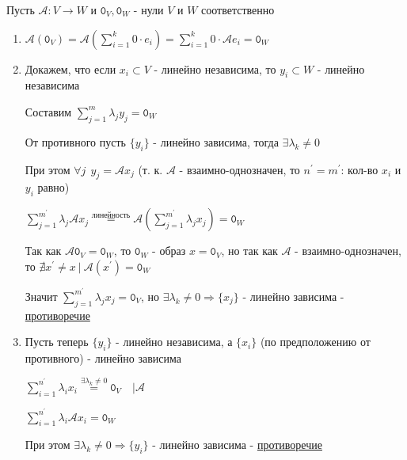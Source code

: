 \documentclass[12pt]{article}
\begin{document}
    \begin{MyProof}
        Пусть $\mathcal{A} : V \rightarrow W$ и $\texttt{0}_V, \texttt{0}_W$ - нули $V$ и $W$ соответственно

        \begin{enumerate}
            \item $\mathcal{A}(\texttt{0}_V) = \mathcal{A}\left(\sum^k_{i=1} 0 \cdot e_i\right) = \sum^k_{i=1} 0 \cdot \mathcal{A}e_i = \texttt{0}_W$

            \item Докажем, что если ${x_i} \subset V$ - линейно независима, то ${y_i} \subset W$ - линейно независима

            Составим $\sum^m_{j=1} \lambda_j y_j = \texttt{0}_W$ 
            
            От противного пусть $\{y_i\}$ - линейно зависима, тогда $\exists \lambda_k \neq 0$

            При этом $\forall j \ \ y_j = \mathcal{A}x_j$ (т. к. $\mathcal{A}$ - взаимно-однозначен, 
            то $n^\prime = m^\prime$: кол-во $x_i$ и $y_i$ равно)

            $\sum^{m^\prime}_{j=1} \lambda_j \mathcal{A}x_j \stackrel{\text{линейность}}{=} \mathcal{A} (\sum^{m^\prime}_{j=1} \lambda_j x_j) = \texttt{0}_W$

            Так как $\mathcal{A}\texttt{0}_V = \texttt{0}_W$, то $\texttt{0}_W$ - образ $x = \texttt{0}_V$, 
            но так как $\mathcal{A}$ - взаимно-однозначен, то
            $\nexists x^\prime \neq x \ | \ \mathcal{A}(x^\prime) = \texttt{0}_W$

            Значит $\sum^{m^\prime}_{j=1} \lambda_j x_j = \texttt{0}_V$, но 
            $\exists \lambda_k \neq 0 \Longrightarrow \{x_j\}$ - линейно зависима - \underline{противоречие}

            \item Пусть теперь $\{y_i\}$ - линейно независима, а $\{x_i\}$ (по предположению от противного) - линейно зависима

            $\sum^{n^\prime}_{i = 1} \lambda_i x_i \stackrel{\exists \lambda_k \neq 0}{=} \texttt{0}_V \quad \Big| \mathcal{A}$

            $\sum^{n^\prime}_{i = 1} \lambda_i \mathcal{A}x_i = \texttt{0}_W$

            При этом $\exists \lambda_k \neq 0 \Longrightarrow \{y_i\}$ - линейно зависима - \underline{противоречие}

        \end{enumerate}
    \end{MyProof}
\end{document}
